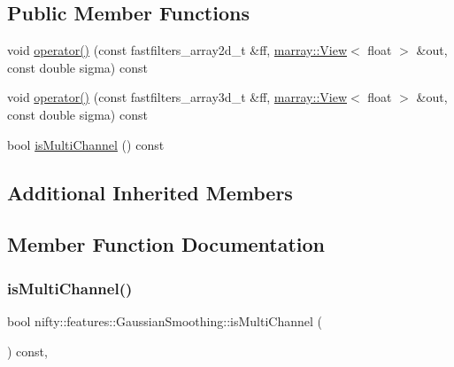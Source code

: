 \subsection*{Public Member Functions}
\begin{DoxyCompactItemize}
\item 
void \hyperlink{structnifty_1_1features_1_1GaussianSmoothing_a1b6bf85baa31180bad4070cc704b8723}{operator()} (const fastfilters\+\_\+array2d\+\_\+t \&ff, \hyperlink{classandres_1_1View}{marray\+::\+View}$<$ float $>$ \&out, const double sigma) const
\item 
void \hyperlink{structnifty_1_1features_1_1GaussianSmoothing_a8daf036e19adc709e3790566861efb86}{operator()} (const fastfilters\+\_\+array3d\+\_\+t \&ff, \hyperlink{classandres_1_1View}{marray\+::\+View}$<$ float $>$ \&out, const double sigma) const
\item 
bool \hyperlink{structnifty_1_1features_1_1GaussianSmoothing_a83bb2660db022cc1d2d302ac41e187ba}{is\+Multi\+Channel} () const
\end{DoxyCompactItemize}
\subsection*{Additional Inherited Members}


\subsection{Member Function Documentation}
\mbox{\label{structnifty_1_1features_1_1GaussianSmoothing_a83bb2660db022cc1d2d302ac41e187ba}} 
\subsubsection{\texorpdfstring{is\+Multi\+Channel()}{isMultiChannel()}}
{\footnotesize\ttfamily bool nifty\+::features\+::\+Gaussian\+Smoothing\+::is\+Multi\+Channel (\begin{DoxyParamCaption}{ }\end{DoxyParamCaption}) const\hspace{0.3cm}{\ttfamily [inline]}, {\ttfamily [virtual]}}



